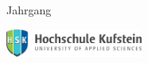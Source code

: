 
\begin{titlepage} 
	\thispagestyle{empty}
	\setcounter{page}{-2}

\begin{center}
	\hspace{1cm}
\vfill

\begin{minipage}{0.99\textwidth}
\begin{center}
\onehalfspacing
\Huge \textsf{\textbf{\mytitle}}
\end{center}
\end{minipage}

\vfill
	\hspace{1cm} \\ \vspace{2em}
\vfill
	\hspace{1cm} \\ \vspace{2em}
\vfill

\textbf{\textsf{\LARGE{%
\autor \\
\arbeit \\
}}}%

\vspace{1em}
\LARGE{%
Jahrgang \jahrgang \\
}%

\end{center}

	\newpage
	\thispagestyle{empty}
	\hspace{1cm}
	\newpage
	\thispagestyle{empty}
\begin{center}

\mbox{\includegraphics[width=4.5cm]{misc/HSK_Logo.pdf}}


\end{center}
\end{titlepage}
